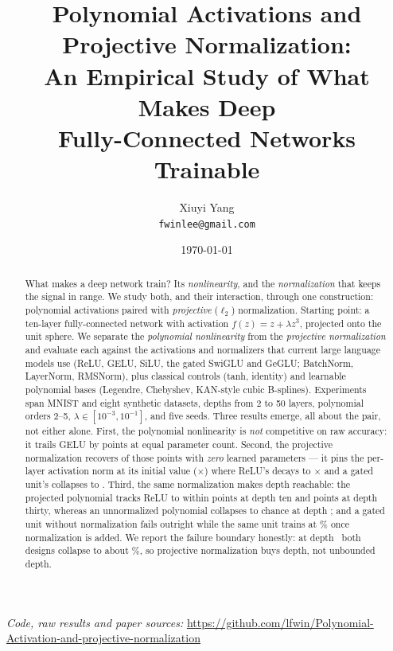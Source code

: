 \documentclass[11pt]{article}
\title{\bf Polynomial Activations and Projective Normalization:\\[2pt]
An Empirical Study of What Makes Deep\\ Fully-Connected Networks Trainable}
\author{Xiuyi Yang\\ \texttt{fwinlee@gmail.com}}
\date{\today}
\begin{document}
\maketitle

\noindent\emph{Code, raw results and paper sources:}
\url{https://github.com/lfwin/Polynomial-Activation-and-projective-normalization}
\vspace{0.6em}



\begin{abstract}
What makes a deep network train? Its \emph{nonlinearity}, and the
\emph{normalization} that keeps the signal in range. We study both, and their
interaction, through one construction: polynomial activations paired with
\emph{projective} ($\ell_2$) normalization. Starting point: a ten-layer
fully-connected network with activation $f(z) = z + \lambda z^{3}$, projected
onto the unit sphere. We separate the \emph{polynomial nonlinearity} from the
\emph{projective normalization} and evaluate each against the activations and
normalizers that current large language models use (ReLU, GELU, SiLU, the gated
SwiGLU and GeGLU; BatchNorm, LayerNorm, RMSNorm), plus classical controls
(tanh, identity) and learnable polynomial bases (Legendre, Chebyshev, KAN-style
cubic B-splines). Experiments span MNIST and eight synthetic datasets, depths
from 2 to 50 layers, polynomial orders 2--5, $\lambda \in [10^{-3}, 10^{-1}]$,
and five seeds. Three results emerge, all about the pair, not either alone.
First, the polynomial nonlinearity is \emph{not} competitive on raw accuracy:
it trails GELU by \polyNoneToBest points at equal parameter count. Second, the
projective normalization recovers \polyGap of those points with \emph{zero}
learned parameters --- it pins the per-layer activation norm at its initial
value (\actNormPolyRatio$\times$) where ReLU's decays to
\actNormReluRatio$\times$ and a gated unit's collapses to \actNormSwiRatio.
Third, the same normalization makes depth reachable: the projected polynomial
tracks ReLU to within \LtenProjVsReluPt points at depth ten and
\LthirtyProjVsReluPt points at depth thirty, whereas an unnormalized polynomial
collapses to chance at depth \dThirty; and a gated unit without normalization
fails outright while the same unit trains at \gluLayerMean\% once normalization
is added. We report the failure boundary honestly: at depth \dFifty\ both
designs collapse to about \LfiftyCollapseAcc\%, so projective normalization
buys depth, not unbounded depth.
\end{abstract}











\end{document}
